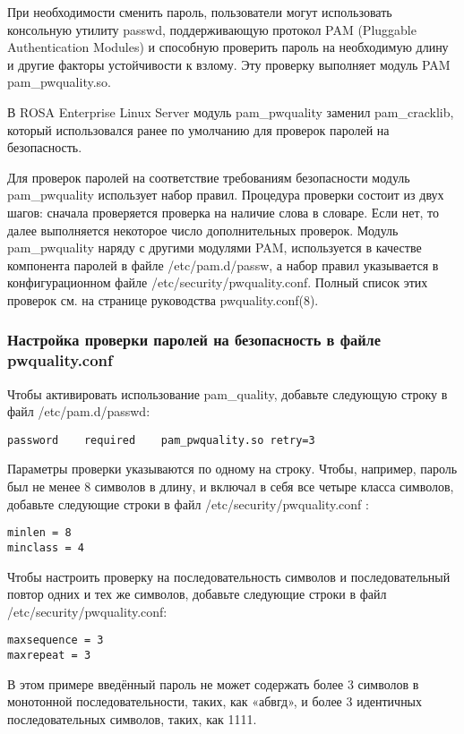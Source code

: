 \documentclass[a4paper,10pt,twoside]{article}
\begin{document}
При необходимости сменить пароль, пользователи могут использовать консольную утилиту passwd, поддерживающую протокол PAM (Pluggable Authentication Modules) и способную проверить пароль на необходимую длину и другие факторы устойчивости к взлому. Эту проверку выполняет модуль PAM pam\_pwquality.so.

В ROSA Enterprise Linux Server модуль pam\_pwquality заменил pam\_cracklib, который использовался ранее по умолчанию для проверок паролей на безопасность. 

Для проверок паролей на соответствие требованиям безопасности модуль pam\_pwquality использует набор правил. Процедура проверки состоит из двух шагов: сначала проверяется проверка на наличие слова в словаре. Если нет, то далее выполняется некоторое число дополнительных проверок. Модуль pam\_pwquality наряду с другими модулями PAM, используется в качестве компонента паролей в файле /etc/pam.d/passw, а набор правил указывается в конфигурационном файле /etc/security/pwquality.conf. Полный список этих проверок см. на странице руководства pwquality.conf(8).


\subsubsection{Настройка проверки паролей на безопасность в файле pwquality.conf}
Чтобы активировать использование pam\_quality, добавьте следующую строку в файл /etc/pam.d/passwd:
\begin{verbatim}
password    required    pam_pwquality.so retry=3
\end{verbatim} 

Параметры проверки указываются по одному на строку. Чтобы, например, пароль был не менее 8 символов в длину, и включал в себя все четыре класса символов, добавьте следующие строки в файл /etc/security/pwquality.conf :
\begin{verbatim}
minlen = 8 
minclass = 4
\end{verbatim} 

Чтобы настроить проверку на последовательность символов и последовательный повтор одних и тех же символов, добавьте следующие строки в файл /etc/security/pwquality.conf:
\begin{verbatim}
maxsequence = 3
maxrepeat = 3
\end{verbatim} 
В этом примере введённый пароль не может содержать более 3 символов в монотонной последовательности, таких, как «абвгд», и более 3 идентичных последовательных символов, таких, как 1111.
\end{document}
